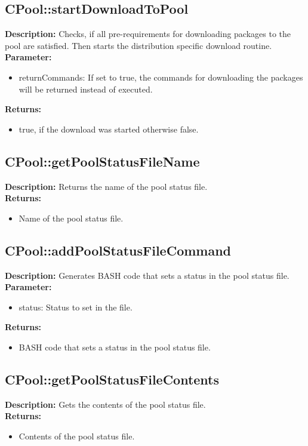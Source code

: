 \subsection{CPool::startDownloadToPool}
\textbf{Description:} Checks, if all pre-requirements for downloading packages to the pool are satisfied. Then starts the distribution specific download routine.\\
\textbf{Parameter:}
\begin{itemize}
\item returnCommands: If set to true, the commands for downloading the packages will be returned instead of executed.
\end{itemize}
\textbf{Returns:}
\begin{itemize}
\item true, if the download was started otherwise false.
\end{itemize}

\subsection{CPool::getPoolStatusFileName}
\textbf{Description:} Returns the name of the pool status file.\\
\textbf{Returns:}
\begin{itemize}
\item Name of the pool status file.
\end{itemize}

\subsection{CPool::addPoolStatusFileCommand}
\textbf{Description:} Generates BASH code that sets a status in the pool status file.\\
\textbf{Parameter:}
\begin{itemize}
\item status: Status to set in the file.
\end{itemize}
\textbf{Returns:}
\begin{itemize}
\item BASH code that sets a status in the pool status file.
\end{itemize}

\subsection{CPool::getPoolStatusFileContents}
\textbf{Description:} Gets the contents of the pool status file.\\
\textbf{Returns:}
\begin{itemize}
\item Contents of the pool status file.
\end{itemize}

